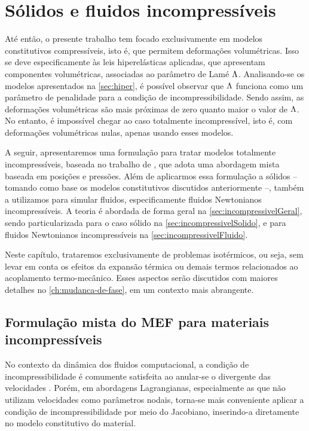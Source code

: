 \documentclass[Tese.tex]{subfiles}
\begin{document}
	
\chapter{Sólidos e fluidos incompressíveis}\label{ch:materiaisIncompressiveis}

Até então, o presente trabalho tem focado exclusivamente em modelos constitutivos compressíveis, isto é, que permitem deformações volumétricas. Isso se deve especificamente às leis hiperelásticas aplicadas, que apresentam componentes volumétricas, associadas ao parâmetro de Lamé $\Lambda$. Analisando-se os modelos apresentados na \autoref{sec:hiper}, é possível observar que $\Lambda$ funciona como um parâmetro de penalidade para a condição de incompressibilidade. Sendo assim, as deformações volumétricas são mais próximas de zero quanto maior o valor de $\Lambda$. No entanto, é impossível chegar ao caso totalmente incompressível, isto é, com deformações volumétricas nulas, apenas usando esses modelos.

A seguir, apresentaremos uma formulação para tratar modelos totalmente incompressíveis, baseada no trabalho de , que adota uma abordagem mista baseada em posições e pressões. Além de aplicarmos essa formulação a sólidos -- tomando como base os modelos constitutivos discutidos anteriormente --, também a utilizamos para simular fluidos, especificamente fluidos Newtonianos incompressíveis. A teoria é abordada de forma geral na \autoref{sec:incompressivelGeral}, sendo particularizada para o caso sólido na \autoref{sec:incompressivelSolido}, e para fluidos Newtonianos incompressíveis na \autoref{sec:incompressivelFluido}.

Neste capítulo, trataremos exclusivamente de problemas isotérmicos, ou seja, sem levar em conta os efeitos da expansão térmica ou demais termos relacionados ao acoplamento termo-mecânico. Esses aspectos serão discutidos com maiores detalhes no \cref{ch:mudanca-de-fase}, em um contexto mais abrangente.

\section{Formulação mista do MEF para materiais incompressíveis}\label{sec:incompressivelGeral}

No contexto da dinâmica dos fluidos computacional, a condição de incompressibilidade é comumente satisfeita ao anular-se o divergente das velocidades \cite{bazilevs2013computational}. Porém, em abordagens Lagrangianas, especialmente as que não utilizam velocidades como parâmetros nodais, torna-se mais conveniente aplicar a condição de incompressibilidade por meio do Jacobiano, inserindo-a diretamente no modelo constitutivo do material.
\end{document}

